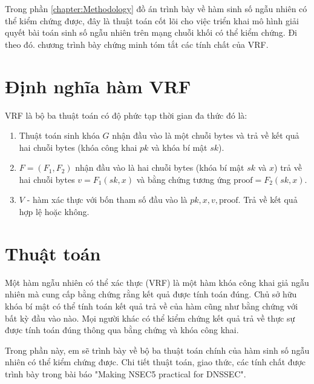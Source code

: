 \documentclass[../main.tex]{subfiles}
\begin{document}
Trong phần \ref{chapter:Methodology} đồ án trình bày về hàm sinh số ngẫu nhiên có thể kiểm chứng được, đây là thuật toán cốt lõi cho việc triển khai mô hình giải quyết bài toán sinh số ngẫu nhiên trên mạng chuỗi khối có thể kiểm chứng. Đi theo đó. chương trình bày chứng minh tóm tắt các tính chất của VRF.


\section{Định nghĩa hàm VRF}
VRF là bộ ba thuật toán có độ phức tạp thời gian đa thức đó là:
\begin{enumerate}
    \item Thuật toán sinh khóa $G$ nhận đầu vào là một chuỗi bytes và trả về kết quả hai chuỗi bytes (khóa công khai $pk$ và khóa bí mật $sk$).
    \item $F = (F_1,F_2)$ nhận đầu vào là hai chuỗi bytes (khóa bí mật $sk$ và $x$) trả về hai chuỗi bytes $v =F_1(sk,x)$ và bằng chứng tương ứng $\text{proof} = F_2(sk,x)$.
    \item $V$ - hàm xác thực với bốn tham số đầu vào là $pk,x,v,\text{proof}$. Trả về kết quả hợp lệ hoặc không.
\end{enumerate}


\section{Thuật toán}

Một hàm ngẫu nhiên có thể xác thực (VRF) là một hàm khóa công khai giả ngẫu nhiên mà cung cấp bằng chứng rằng kết quả được tính toán đúng. Chủ sở hữu khóa bí mật có thể tính toán kết quả trả về của hàm cũng như bằng chứng với bất kỳ đầu vào nào. Mọi người khác có thể kiểm chứng kết quả trả về thực sự được tính toán đúng thông qua bằng chứng và khóa công khai.

Trong phần này, em sẽ trình bày về bộ ba thuật toán chính của hàm sinh số ngẫu nhiên có thể kiểm chứng được. Chi tiết thuật toán, giao thức, các tính chất được trình bày trong bài báo  \cite{papadopoulos2017making} "Making NSEC5 practical for DNSSEC".
\end{document}
